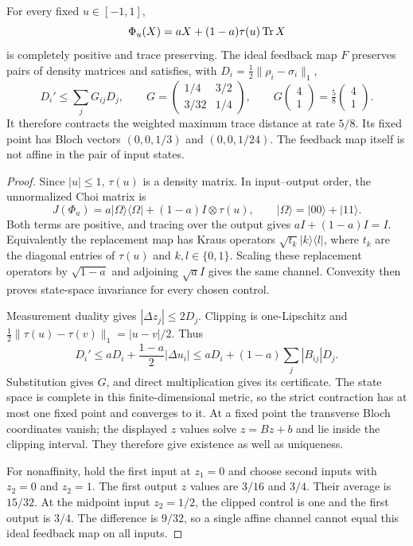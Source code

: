 \begin{proposition}
\label{prop:qtf-feedback-example}
For every fixed $u\in[-1,1]$,
\[
 \Phi_u(X)=aX+(1-a)\tau(u)\operatorname{Tr} X
\]
is completely positive and trace preserving. The ideal feedback map $F$
preserves pairs of density matrices and satisfies, with
$D_i=\tfrac12\|\rho_i-\sigma_i\|_1$,
\[
 D_i'\le\sum_jG_{ij}D_j,\qquad
 G=\begin{pmatrix}1/4&3/2\\3/32&1/4\end{pmatrix},\qquad
 G\begin{pmatrix}4\\1\end{pmatrix}
 =\tfrac58\begin{pmatrix}4\\1\end{pmatrix}.
\]
It therefore contracts the weighted maximum trace distance at rate $5/8$.
Its fixed point has Bloch vectors $(0,0,1/3)$ and $(0,0,1/24)$.
The feedback map itself is not affine in the pair of input states.
\end{proposition}
\begin{proof}
Since $|u|\le1$, $\tau(u)$ is a density matrix. In input--output order,
the unnormalized Choi matrix is
\[
 J(\Phi_u)=a|\Omega\rangle\langle\Omega|
 +(1-a)I\otimes\tau(u),\qquad
 |\Omega\rangle=|00\rangle+|11\rangle.
\]
Both terms are positive, and tracing over the output gives
$aI+(1-a)I=I$. Equivalently the replacement map has Kraus operators
$\sqrt{t_k}|k\rangle\langle l|$, where $t_k$ are the diagonal entries
of $\tau(u)$ and $k,l\in\{0,1\}$. Scaling these replacement operators
by $\sqrt{1-a}$ and adjoining $\sqrt a I$ gives the same channel.
Convexity then proves state-space
invariance for every chosen control.

Measurement duality gives $|\Delta z_j|\le2D_j$. Clipping is
one-Lipschitz and
$\tfrac12\|\tau(u)-\tau(v)\|_1=|u-v|/2$. Thus
\[
 D_i'\le aD_i+\frac{1-a}{2}|\Delta u_i|
 \le aD_i+(1-a)\sum_j|B_{ij}|D_j.
\]
Substitution gives $G$, and direct multiplication gives its certificate.
The state space is complete in this finite-dimensional metric, so the
strict contraction has at most one fixed point and converges to it.
At a fixed point the transverse Bloch coordinates vanish; the displayed
$z$ values solve $z=Bz+b$ and lie inside the clipping interval. They
therefore give existence as well as uniqueness.

For nonaffinity, hold the first input at $z_1=0$ and choose second inputs
with $z_2=0$ and $z_2=1$. The first output $z$ values are $3/16$ and
$3/4$. Their average is $15/32$. At the midpoint input $z_2=1/2$,
the clipped control is one and the first output is $3/4$. The difference
is $9/32$, so a single affine channel cannot equal this ideal feedback
map on all inputs.
\end{proof}

